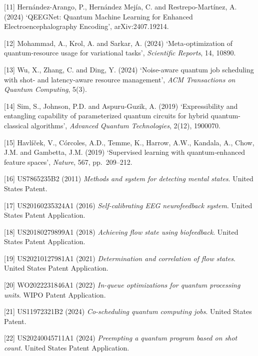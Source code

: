 \documentclass[12pt,a4paper]{article}
\begin{document}
{[}11{]} Hernández-Arango, P., Hernández Mejía, C. and Restrepo-Martínez, A. (2024) `QEEGNet: Quantum Machine Learning for Enhanced Electroencephalography Encoding', arXiv:2407.19214.



{[}12{]} Mohammad, A., Krol, A. and Sarkar, A. (2024) `Meta-optimization of quantum-resource usage for variational tasks', \emph{Scientific Reports}, 14, 10890.



{[}13{]} Wu, X., Zhang, C. and Ding, Y. (2024) `Noise-aware quantum job scheduling with shot- and latency-aware resource management', \emph{ACM Transactions on Quantum Computing}, 5(3).



{[}14{]} Sim, S., Johnson, P.D. and Aspuru-Guzik, A. (2019) `Expressibility and entangling capability of parameterized quantum circuits for hybrid quantum-classical algorithms', \emph{Advanced Quantum Technologies}, 2(12), 1900070.



{[}15{]} Havlíček, V., Córcoles, A.D., Temme, K., Harrow, A.W., Kandala, A., Chow, J.M. and Gambetta, J.M. (2019) `Supervised learning with quantum-enhanced feature spaces', \emph{Nature}, 567, pp.~209--212.



{[}16{]} US7865235B2 (2011) \emph{Methods and system for detecting mental states}. United States Patent.



{[}17{]} US20160235324A1 (2016) \emph{Self-calibrating EEG neurofeedback system}. United States Patent Application.



{[}18{]} US20180279899A1 (2018) \emph{Achieving flow state using biofeedback}. United States Patent Application.



{[}19{]} US20210127981A1 (2021) \emph{Determination and correlation of flow states}. United States Patent Application.



{[}20{]} WO2022231846A1 (2022) \emph{In-queue optimizations for quantum processing units}. WIPO Patent Application.



{[}21{]} US11972321B2 (2024) \emph{Co-scheduling quantum computing jobs}. United States Patent.



{[}22{]} US20240045711A1 (2024) \emph{Preempting a quantum program based on shot count}. United States Patent Application.
\end{document}
